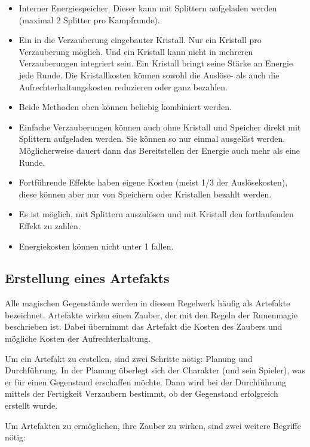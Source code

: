 \documentclass{article}
\begin{document}
\begin{itemize}
\item Interner Energiespeicher. Dieser kann mit Splittern aufgeladen werden (maximal 2 Splitter pro Kampfrunde).
\item Ein in die Verzauberung eingebauter Kristall. Nur ein Kristall pro Verzauberung möglich. Und ein Kristall kann nicht in mehreren Verzauberungen integriert sein. Ein Kristall bringt seine Stärke an Energie jede Runde. Die Kristallkosten können sowohl die Auslöse- als auch die Aufrechterhaltungskosten reduzieren oder ganz bezahlen.
\item Beide Methoden oben können beliebig kombiniert werden.
\item Einfache Verzauberungen können auch ohne Kristall und Speicher direkt mit Splittern aufgeladen werden. Sie können so nur einmal ausgelöst werden. Möglicherweise dauert dann das Bereitstellen der Energie auch mehr als eine Runde.
\item Fortführende Effekte haben eigene Kosten (meist 1/3 der Auslösekosten), diese können aber nur von Speichern oder Kristallen bezahlt werden.
\item Es ist möglich, mit Splittern auszulösen und mit Kristall den fortlaufenden Effekt zu zahlen.
\item Energiekosten können nicht unter 1 fallen.
\end{itemize}

\begin{center}
\subsection{Erstellung eines Artefakts}
\end{center}

Alle magischen Gegenstände werden in diesem Regelwerk häufig als Artefakte bezeichnet. Artefakte wirken einen Zauber,
der mit den Regeln der Runenmagie beschrieben ist. Dabei übernimmt das Artefakt die Kosten des Zaubers und mögliche
Kosten der Aufrechterhaltung.

Um ein Artefakt zu erstellen, sind zwei Schritte nötig: Planung und Durchführung. In der Planung überlegt sich der
Charakter (und sein Spieler), was er für einen Gegenstand erschaffen möchte. Dann wird bei der Durchführung mittels
der Fertigkeit Verzaubern bestimmt, ob der Gegenstand erfolgreich erstellt wurde.

Um Artefakten zu ermöglichen, ihre Zauber zu wirken, sind zwei weitere Begriffe nötig:
\end{document}

